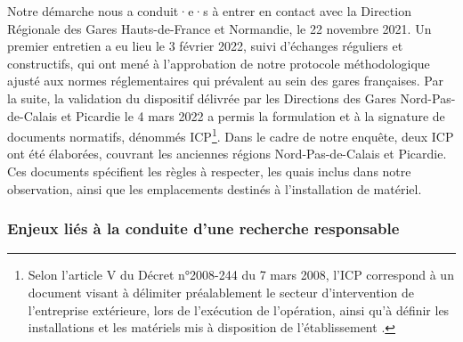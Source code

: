 \begin{refsegment}
Notre démarche nous a conduit·e·s à entrer en contact avec la Direction Régionale des Gares Hauts-de-France et Normandie, le 22 novembre 2021. Un premier entretien a eu lieu le 3 février 2022, suivi d'échanges réguliers et constructifs, qui ont mené à l'approbation de notre protocole méthodologique ajusté aux normes réglementaires qui prévalent au sein des gares françaises. Par la suite, la validation du dispositif délivrée par les Directions des Gares Nord-Pas-de-Calais et Picardie le 4 mars 2022 a permis la formulation et à la signature de documents normatifs, dénommés \acrfull{ICP}\footnote{
Selon l'article V du Décret n°2008-244 du 7 mars 2008, l'\acrshort{ICP} correspond à un document visant à délimiter préalablement le secteur d’intervention de l’entreprise extérieure, lors de l’exécution de l’opération, ainsi qu’à définir les installations et les matériels mis à disposition de l’établissement \textcolor{blue}{\autocite{legifrance_section_2008}}.
}. Dans le cadre de notre enquête, deux \acrshort{ICP} ont été élaborées, couvrant les anciennes régions Nord-Pas-de-Calais et Picardie. Ces documents spécifient les règles à respecter, les quais inclus dans notre observation, ainsi que les emplacements destinés à l'installation de matériel.%

\subsubsection*{Enjeux liés à la conduite d'une recherche responsable
    \label{chap3:rgpd}
    }
    

\end{refsegment}
